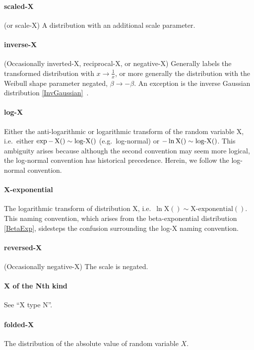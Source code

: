 \paragraph*{scaled-X} (or scale-X) A distribution with an additional scale parameter. 

\paragraph*{inverse-X} (Occasionally inverted-X, reciprocal-X, or negative-X) Generally labels the transformed distribution with $x\to\tfrac{1}{x}$, or more generally the distribution with the Weibull shape parameter negated, $\beta\to-\beta$. An exception is the inverse Gaussian distribution \eqref{InvGaussian}~\cite{Johnson1994}. 

\paragraph*{log-X}   Either the anti-logarithmic or logarithmic transform of the random variable X, i.e.\ either  $\exp - \operatorname{X}() \sim \operatorname{log-X}()$ (e.g.\ log-normal)  or $-\ln \text{X}() \sim \operatorname{log-X}()$.  This ambiguity arises because although the second convention may seem more logical, the log-normal convention has historical precedence. Herein, we follow the log-normal convention. 
\label{log-transform-name}

\paragraph*{X-exponential}  The logarithmic transform of distribution X, i.e.\ $\ln \text{X}() \sim \text{X-exponential}()$. This naming convention, which arises from the beta-exponential distribution \eqref{BetaExp}, sidesteps the confusion surrounding the log-X naming convention.


\paragraph*{reversed-X} (Occasionally negative-X)  The scale is negated. 
\paragraph*{X of the Nth kind} See ``X type N''.

\paragraph*{folded-X} The distribution of the absolute value of random variable $X$. %

